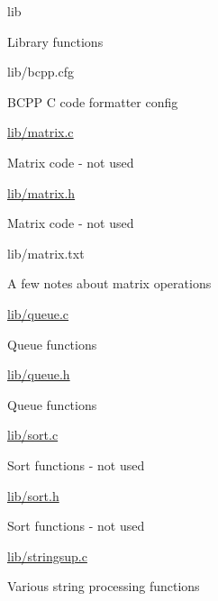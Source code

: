 \begin{DoxyItemize}
\begin{DoxyItemize}
\end{DoxyItemize}
\item lib
\begin{DoxyItemize}
\item Library functions
\item lib/bcpp.\+cfg
\begin{DoxyItemize}
\item B\+C\+PP C code formatter config
\end{DoxyItemize}
\item \hyperlink{matrix_8c}{lib/matrix.\+c}
\begin{DoxyItemize}
\item Matrix code -\/ not used
\end{DoxyItemize}
\item \hyperlink{matrix_8h}{lib/matrix.\+h}
\begin{DoxyItemize}
\item Matrix code -\/ not used
\end{DoxyItemize}
\item lib/matrix.\+txt
\begin{DoxyItemize}
\item A few notes about matrix operations
\end{DoxyItemize}
\item \hyperlink{queue_8c}{lib/queue.\+c}
\begin{DoxyItemize}
\item Queue functions
\end{DoxyItemize}
\item \hyperlink{queue_8h}{lib/queue.\+h}
\begin{DoxyItemize}
\item Queue functions
\end{DoxyItemize}
\item \hyperlink{sort_8c}{lib/sort.\+c}
\begin{DoxyItemize}
\item Sort functions -\/ not used
\end{DoxyItemize}
\item \hyperlink{sort_8h}{lib/sort.\+h}
\begin{DoxyItemize}
\item Sort functions -\/ not used
\end{DoxyItemize}
\item \hyperlink{stringsup_8c}{lib/stringsup.\+c}
\begin{DoxyItemize}
\item Various string processing functions
\end{DoxyItemize}

\end{DoxyItemize}
\end{DoxyItemize}
